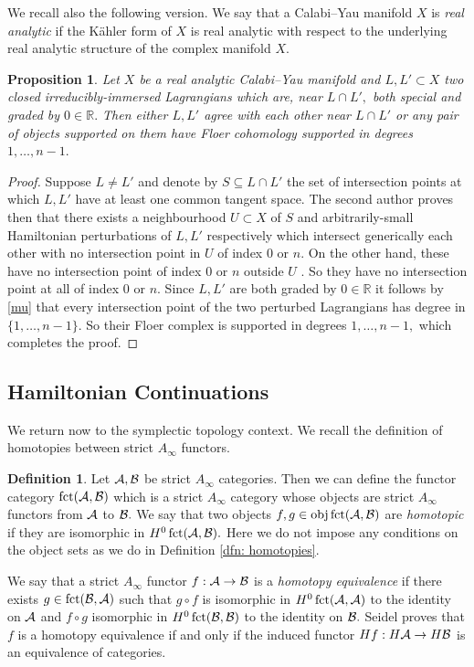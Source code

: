 \documentclass{article}
\DeclareMathOperator{\fct}{fct}\DeclareMathOperator{\Def}{Def}\DeclareMathOperator{\Gal}{Gal}
\theoremstyle{plain}%
\newtheorem{prop}[thm]{Proposition}
\theoremstyle{definition}
\newtheorem{dfn}[thm]{Definition}
\numberwithin{equation}{section}
\numberwithin{figure}{section}
\def\eq{\eqref}
\def\l{\label}
\def\cA{{\mathbin{\cal A}}}
\def\cB{{\mathbin{\cal B}}}
\def\R{{\mathbin{\mathbb R}}}
\def\iy{\infty}
\def\cm{\circ}
\def\sb{\subseteq}
\begin{document}
We recall also the following version.
We say that a Calabi--Yau manifold $X$ is {\it real analytic} if the K\"ahler form of $X$ is real analytic with respect to the underlying real analytic structure of the complex manifold $X.$
\begin{prop}\l{prop: TY2}
Let $X$ be a real analytic Calabi--Yau manifold and $L,L'\subset X$ two closed irreducibly-immersed Lagrangians which are, near $L\cap L',$ both special and graded by $0\in\R.$
Then either $L,L'$ agree with each other near $L\cap L'$ or any pair of objects supported on them have Floer cohomology supported in degrees $1,\dots,n-1.$  
\end{prop}
\begin{proof}
Suppose $L\ne L'$ and denote by $S\sb L\cap L'$ the set of intersection points at which $L,L'$ have at least one common tangent space. The second author \cite[Theorem 5.1(i)]{I} proves then that there exists a neighbourhood $U\subset X$ of $S$ and arbitrarily-small Hamiltonian perturbations of $L,L'$ respectively which intersect generically each other with no intersection point in $U$ of index $0$ or $n.$
On the other hand, these have no intersection point of index $0$ or $n$ outside $U$ \cite[Lemma 2.7]{I}.
So they have no intersection point at all of index $0$ or $n.$
Since $L,L'$ are both graded by $0\in\R$ it follows by \eq{mu} that every intersection point of the two perturbed Lagrangians has degree in $\{1,\dots,n-1\}.$ So their Floer complex is supported in degrees $1,\dots,n-1,$ which completes the proof.
\end{proof}


\subsection{Hamiltonian Continuations}\l{sec: Ham}
We return now to the symplectic topology context. 
We recall the definition of homotopies between strict $A_\iy$ functors.
\begin{dfn}
Let $\cA,\cB$ be strict $A_\iy$ categories. Then we can define the functor category $\fct(\cA,\cB)$ which is a strict $A_\iy$ category whose objects are strict $A_\iy$ functors from $\cA$ to $\cB.$
We say that two objects $f,g\in\obj\fct(\cA,\cB)$ are {\it homotopic} if they are isomorphic in $H^0\fct(\cA,\cB).$
Here we do not impose any conditions on the object sets as we do in Definition \ref{dfn: homotopies}.

We say that a strict $A_\iy$ functor $f:\cA\to\cB$ is a {\it homotopy equivalence} if there exists $g\in\fct(\cB,\cA)$ such that $g\cm f$ is isomorphic in $H^0\fct(\cA,\cA)$ to the identity on $\cA$ and $f\cm g$ isomorphic in $H^0\fct(\cB,\cB)$ to the identity on $\cB.$
Seidel \cite[Theorem 2.9]{Seid3} proves that $f$ is a homotopy equivalence if and only if the induced functor $Hf:H\cA\to H\cB$ is an equivalence of categories. 
\end{dfn}
\end{document}
